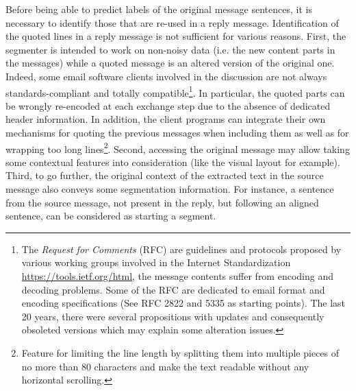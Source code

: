 Before being able to predict labels of the original message sentences, it is necessary to identify those that are re-used in a reply message. 
Identification of the quoted lines in a reply message is not sufficient for various reasons. 
%
First, the segmenter is intended to work on non-noisy data (i.e. the new content parts in the messages) while a quoted message is an altered version of the original one. 
Indeed, some email software clients involved in the discussion %
are not always standards-compliant and totally compatible\footnote{The \textit{Request for Comments} (RFC) are guidelines and protocols proposed by various working groups involved in the Internet Standardization \url{https://tools.ietf.org/html}, the message contents suffer from encoding and decoding problems. Some of the RFC are dedicated to email format and encoding specifications (See RFC 2822 and 5335 as starting points). The last 20 years, there were several propositions with updates and consequently obsoleted versions which may explain some alteration issues.}. 
In particular, the quoted parts can be wrongly re-encoded at each exchange step due to the absence of dedicated header information. %
In addition, the client programs can integrate their own mechanisms for quoting the previous messages when including them as well as for wrapping too long lines\footnote{Feature for limiting the line length by splitting them into multiple pieces of no more than 80 characters and make the text readable without any horizontal scrolling.}.
%
%
% 
%
Second, accessing the original message may allow taking some contextual features into consideration (like the visual layout for example). 
%
Third, to go further, the original context of the extracted text in the source message also conveys some segmentation information. For instance, a sentence from the source message, not present in the reply, but following an aligned sentence, can be considered as starting a segment.

